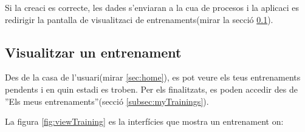 Si la creaci \´e{s} correcte, les dades s'enviaran a la cua de procesos i la aplicaci es redirigir la pantalla de visualitzaci de entrenaments(mirar la secció \ref{subsec:viewtraining}).

\subsection{Visualitzar un entrenament}
\label{subsec:viewtraining}
Des de la casa de l'usuari(mirar \ref{sec:home}), es pot veure els teus entrenaments pendents i en quin estadi es troben. Per els finalitzats, es poden accedir des de ''Els meus entrenaments''(secció \ref{subsec:myTrainings}).

La figura \ref{fig:viewTraining} es la interfícies que mostra un entrenament on:

